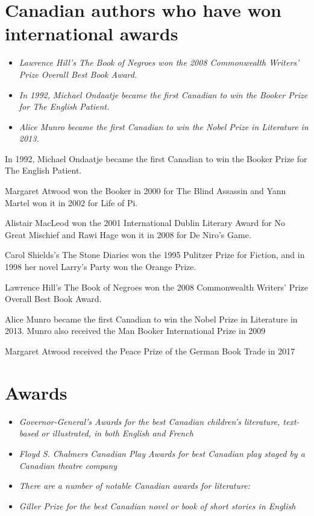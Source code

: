\section{Canadian authors who have won international
awards}\label{canadian-authors-who-have-won-international-awards}

\begin{itemize}
\item
  \emph{Lawrence Hill's The Book of Negroes won the 2008 Commonwealth
  Writers' Prize Overall Best Book Award.}
\item
  \emph{In 1992, Michael Ondaatje became the first Canadian to win the
  Booker Prize for The English Patient.}
\item
  \emph{Alice Munro became the first Canadian to win the Nobel Prize in
  Literature in 2013.}
\end{itemize}

In 1992, Michael Ondaatje became the first Canadian to win the Booker
Prize for The English Patient.

Margaret Atwood won the Booker in 2000 for The Blind Assassin and Yann
Martel won it in 2002 for Life of Pi.

Alistair MacLeod won the 2001 International Dublin Literary Award for No
Great Mischief and Rawi Hage won it in 2008 for De Niro's Game.

Carol Shields's The Stone Diaries won the 1995 Pulitzer Prize for
Fiction, and in 1998 her novel Larry's Party won the Orange Prize.

Lawrence Hill's The Book of Negroes won the 2008 Commonwealth Writers'
Prize Overall Best Book Award.

Alice Munro became the first Canadian to win the Nobel Prize in
Literature in 2013. Munro also received the Man Booker International
Prize in 2009

Margaret Atwood received the Peace Prize of the German Book Trade in
2017

\section{Awards}\label{awards}

\begin{itemize}
\item
  \emph{Governor-General's Awards for the best Canadian children's
  literature, text-based or illustrated, in both English and French}
\item
  \emph{Floyd S. Chalmers Canadian Play Awards for best Canadian play
  staged by a Canadian theatre company}
\item
  \emph{There are a number of notable Canadian awards for literature:}
\item
  \emph{Giller Prize for the best Canadian novel or book of short
  stories in English}
\end{itemize}

